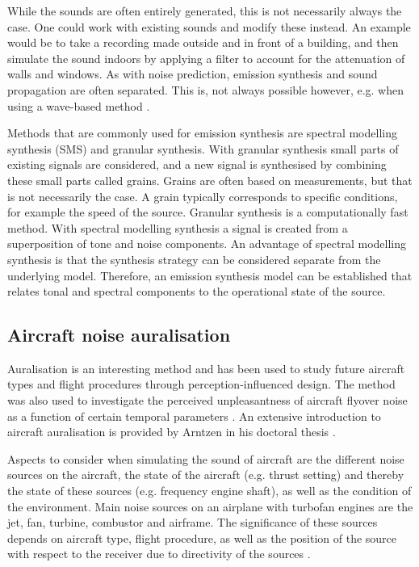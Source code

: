While the sounds are often entirely generated, this is not necessarily always the
case. One could work with existing sounds and modify these instead. An example
would be to take a recording made outside and in front of a building, and then
simulate the sound indoors by applying a filter to account for the attenuation
of walls and windows. As with noise prediction, emission synthesis and sound
propagation are often separated. This is, not always possible however, e.g. when
using a wave-based method \cite{Hornikx2016,Georgiou2016,Georgiou2016a}.

Methods that are commonly used for emission synthesis are spectral modelling
synthesis (SMS) and granular synthesis. With granular synthesis small parts of
existing signals are considered, and a new signal is synthesised by combining
these small parts called grains. Grains are often based on measurements, but
that is not necessarily the case. A grain typically corresponds to specific
conditions, for example the speed of the source. Granular
synthesis is a computationally fast method. With spectral modelling synthesis a
signal is created from a superposition of tone and noise components. An
advantage of spectral modelling synthesis is that the synthesis strategy can be
considered separate from the underlying model. Therefore, an emission synthesis
model can be established that relates tonal and spectral components to the
operational state of the source.

\subsection{Aircraft noise auralisation}
Auralisation is an interesting method and has been used to study future aircraft
types \cite{Rizzi2013,Rizzi2016,Rizzi2016a} and flight procedures
\cite{Sahai2016} through perception-influenced design. The method was also used
to investigate the perceived unpleasantness of aircraft flyover noise as a
function of certain temporal parameters \cite{Pate2017}.
An extensive introduction to aircraft auralisation is provided by Arntzen in his
doctoral thesis \cite{Arntzen2014a}.

Aspects to consider when simulating the sound of aircraft are the different
noise sources on the aircraft, the state of the aircraft (e.g. thrust setting)
and thereby the state of these sources (e.g. frequency engine shaft), as well as
the condition of the environment. Main noise sources on an airplane with
turbofan engines are the jet, fan, turbine, combustor and airframe. The
significance of these sources depends on aircraft type, flight procedure, as
well as the position of the source with respect to the receiver due to
directivity of the sources \cite{Bertsch2015}.

